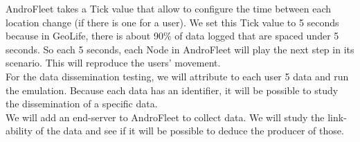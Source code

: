 AndroFleet takes a Tick value that allow to configure the time between each location change (if there is one for a user).
We set this Tick value to 5 seconds because in GeoLife, there is about 90\% of data logged that are spaced under 5 seconds.
So each 5 seconds, each Node in AndroFleet will play the next step in its scenario.
This will reproduce the users' movement. 
\\

For the data dissemination testing, we will attribute to each user 5 data and run the emulation.
Because each data has an identifier, it will be possible to study the dissemination of a specific data.
\\

We will add an end-server to AndroFleet to collect data.
We will study the link-ability of the data and see if it will be possible to deduce the producer of those.

